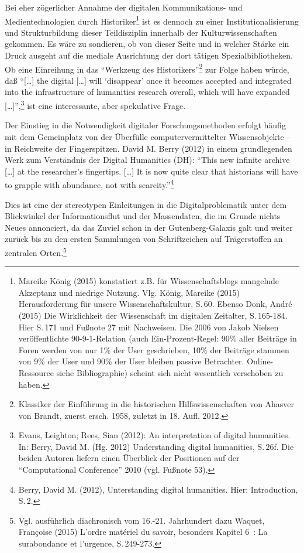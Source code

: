 \documentclass[a4paper,
fontsize=11pt,
oneside,
numbers=noperiodatend,
parskip=half-,
bibliography=totoc,
final
]{scrartcl}
\begin{document}
Bei eher zögerlicher Annahme der digitalen Kommunikations- und
Medientechnologien durch Historiker\footnote{Mareike König (2015)
  konstatiert z.B. für Wissenschaftsblogs mangelnde Akzeptanz und
  niedrige Nutzung. Vlg. König, Mareike (2015) Herausforderung für
  unsere Wissenschaftskultur, S.\,60. Ebenso Donk, André (2015) Die
  Wirklichkeit der Wissenschaft im digitalen Zeitalter, S.\,165-184. Hier
  S.\,171 und Fußnote 27 mit Nachweisen. Die 2006 von Jakob Nielsen
  veröffentlichte 90-9-1-Relation (auch Ein-Prozent-Regel: 90\% aller
  Beiträge in Foren werden von nur 1\% der User geschrieben, 10\% der
  Beiträge stammen von 9\% der User und 90\% der User bleiben passive
  Betrachter. Online-Ressource siehe Bibliographie) scheint sich nicht
  wesentlich verschoben zu haben.} ist es dennoch zu einer
Institutionalisierung und Strukturbildung dieser Teildisziplin innerhalb
der Kulturwissenschaften gekommen. Es wäre zu sondieren, ob von dieser
Seite und in welcher Stärke ein Druck ausgeht auf die mediale
Ausrichtung der dort tätigen Spezialbibliotheken. Ob eine Einreihung in
das \enquote{Werkzeug des Historikers}\footnote{Klassiker der Einführung
  in die historischen Hilfswissenschaften von Ahasver von Brandt, zuerst
  ersch. 1958, zuletzt in 18. Aufl. 2012.} zur Folge haben würde, daß
\enquote{{[}\ldots{}{]} the digital {[}\ldots{}{]} will
\enquote{disappear} once it becomes accepted and integrated into the
infrastructure of humanities research overall, which will have expanded
{[}\ldots{}{]}},\footnote{Evans, Leighton; Rees, Sian (2012): An
  interpretation of digital humanities. In: Berry, David M. (Hg. 2012)
  Understanding digital humanities, S.\,26f. Die beiden Autoren liefern
  einen Überblick der Positionen auf der \enquote{Computational
  Conference} 2010 (vgl. Fußnote 53).} ist eine interessante, aber
spekulative Frage.

Der Einstieg in die Notwendigkeit digitaler Forschungsmethoden erfolgt
häufig mit dem Gemeinplatz von der Überfülle computervermittelter
Wissensobjekte -- in Reichweite der Fingerspitzen. David M. Berry (2012)
in einem grundlegenden Werk zum Verständnis der Digital Humanities (DH):
\enquote{This new infinite archive {[}\ldots{}{]} at the researcher's
fingertips. {[}\ldots{}{]} It is now quite clear that historians will
have to grapple with abundance, not with scarcity.}\footnote{Berry,
  David M. (2012), Unterstanding digital humanities. Hier: Introduction,
  S.\,2.}

Dies ist eine der stereotypen Einleitungen in die Digitalproblematik
unter dem Blickwinkel der Informationsflut und der Massendaten, die im
Grunde nichts Neues annonciert, da das Zuviel schon in der
Gutenberg-Galaxis galt und weiter zurück bis zu den ersten Sammlungen
von Schriftzeichen auf Trägerstoffen an zentralen Orten.\footnote{Vgl.
  ausführlich diachronisch vom 16.-21. Jahrhundert dazu Waquet,
  Françoise (2015) L'ordre matériel du savoir, besonders Kapitel 6~: La
  surabondance et l'urgence, S.\,249-273.}
\end{document}
